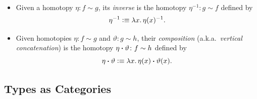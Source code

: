 \begin{defns}\label{defn:homotopy-inverse-and-ct}${}$
    \begin{itemize}
        \item Given a homotopy $\eta\colon f\sim g$, its \textsl{inverse} is the homotopy $\eta^{-1}\colon g\sim f$ defined by
        \[
            \eta^{-1}\mathrel{\vcentcolon}\equiv\lambda x.\,\eta(x)^{-1}.
        \]
        
        \item Given homotopies $\eta\colon f\sim g$ and $\vartheta\colon g\sim h$, their \textsl{composition} (a.k.a.\ \textsl{vertical concatenation}) is the homotopy $\eta\ct\vartheta\colon f\sim h$ defined by
        \[
            \eta\mathbin{\boldsymbol{\cdot}}\vartheta\mathrel{\vcentcolon}\equiv\lambda x.\,
                \eta(x)\mathbin{\boldsymbol{\cdot}}\vartheta(x).
        \]
    \end{itemize}
\end{defns}

\subsection{Types as Categories}\label{types-as-categories}

